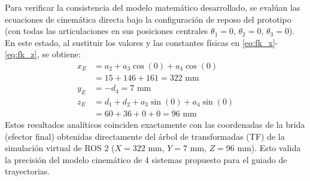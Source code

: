\documentclass[conference,a4paper]{IEEEtran}
\begin{document}
Para verificar la consistencia del modelo matemático desarrollado, se evalúan las ecuaciones de cinemática directa bajo la configuración de reposo del prototipo (con todas las articulaciones en sus posiciones centrales $\theta_1 = 0$, $\theta_2 = 0$, $\theta_3 = 0$). En este estado, al sustituir los valores y las constantes físicas en \eqref{eq:fk_x}-\eqref{eq:fk_z}, se obtiene:
\begin{align}
x_E &= a_2 + a_3 \cos(0) + a_4 \cos(0) \nonumber \\
    &= 15 + 146 + 161 = 322\text{ mm} \\
y_E &= -d_4 = 7\text{ mm} \\
z_E &= d_1 + d_2 + a_3 \sin(0) + a_4 \sin(0) \nonumber \\
    &= 60 + 36 + 0 + 0 = 96\text{ mm}
\end{align}
Estos resultados analíticos coinciden exactamente con las coordenadas de la brida (efector final) obtenidas directamente del árbol de transformadas (TF) de la simulación virtual de ROS 2 ($X = 322\text{ mm}$, $Y = 7\text{ mm}$, $Z = 96\text{ mm}$). Esto valida la precisión del modelo cinemático de 4 sistemas propuesto para el guiado de trayectorias.
\end{document}
